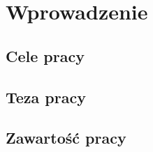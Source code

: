 \chapter{Wprowadzenie}
\label{cha:wprowadzenie}


\section{Cele pracy}
\label{sec:celePracy}


\section{Teza pracy}
\label{sec:teza}

\section{Zawartość pracy}
\label{sec:zawartoscPracy}



















